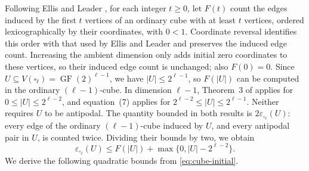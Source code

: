 \documentclass[11pt]{article}
\numberwithin{equation}{section}
\DeclareMathOperator{\GF}{GF}
\newcommand{\FF}{\GF(2)}
\begin{document}
Following Ellis and Leader \cite{EllisLeader2018}, for each integer
\(t\ge0\), let \(F(t)\) count the edges induced by the first \(t\)
vertices of an ordinary cube with at least \(t\) vertices, ordered
lexicographically by their coordinates, with \(0<1\).
Coordinate reversal identifies this order with that used by Ellis and Leader
and preserves the induced edge count.
Increasing the ambient dimension only adds initial zero coordinates to these vertices,
so their induced edge count is unchanged; also \(F(0)=0\).
Since \(U\subseteq V(\square_\ell)=\FF^{\ell-1}\), we have
\(|U|\le2^{\ell-1}\), so \(F(|U|)\) can be computed in the
ordinary \((\ell-1)\)-cube.
In dimension \(\ell-1\), Theorem~3 of \cite{EllisLeader2018} applies for
\(0\le|U|\le2^{\ell-2}\), and equation~(7) applies for
\(2^{\ell-2}\le|U|\le2^{\ell-1}\). Neither requires \(U\) to be antipodal.
The quantity bounded in both results is \(2\varepsilon_{\square_\ell}(U)\):
every edge of the ordinary \((\ell-1)\)-cube induced by \(U\),
and every antipodal pair in \(U\), is counted twice.
Dividing their bounds by two, we obtain
\begin{equation}\label{eq:cube-initial}
 \varepsilon_{\square_\ell}(U)
 \le F(|U|)+\max\{0,|U|-2^{\ell-2}\}.
\end{equation}
We derive the following quadratic bounds from \eqref{eq:cube-initial}.
\end{document}
